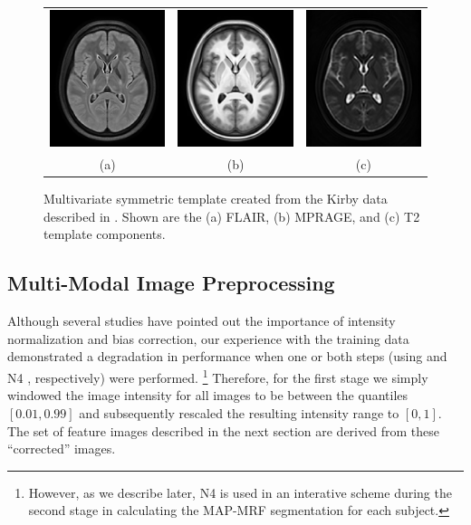 \documentclass{llncs}
\begin{document}
\begin{figure}
  \centering
  \begin{tabular}{ccc}
    \includegraphics[width=38mm]{Figures/S_templateFLAIR_140.png} &
    \includegraphics[width=38mm]{Figures/S_templateT1_140.png} &
    \includegraphics[width=38mm]{Figures/S_templateT2_140.png} \\
        (a) & (b) & (c)
  \end{tabular}
  \caption{Multivariate symmetric template created from the Kirby 
           data described in \cite{landman2011}.  Shown are the
           (a) FLAIR, (b) MPRAGE, 
           and (c) T2 template components.
          }
  \label{fig:symmetrictemplates}
\end{figure}

\subsection{Multi-Modal Image Preprocessing}

Although several studies have pointed out the importance of
intensity normalization and bias correction, our experience 
with the training data demonstrated a degradation in performance
when one or both steps (using \cite{nyul2000} and N4 \cite{tustison2010},
respectively) were performed.%
\footnote{
However, as we describe later, N4 is used in an interative scheme during the second
stage in calculating the MAP-MRF segmentation for each subject.  
} 
Therefore, for the first stage we simply windowed the image intensity
for all images to be between the quantiles $[0.01,0.99]$ and
subsequently rescaled the resulting intensity range to $[0,1]$.  
The set of feature images described in the next section are derived 
from these ``corrected'' images.  
\end{document}
